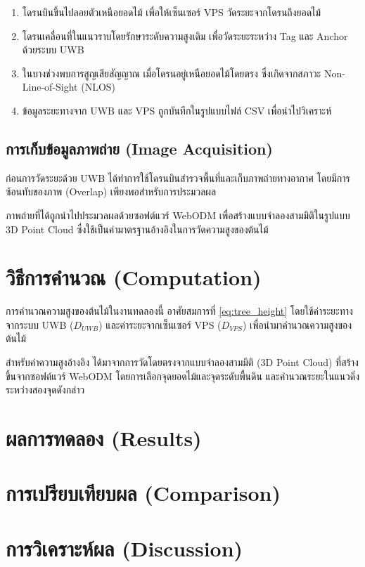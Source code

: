 \begin{enumerate}
    \item โดรนบินขึ้นไปลอยตัวเหนือยอดไม้ 
    เพื่อให้เซ็นเซอร์ VPS วัดระยะจากโดรนถึงยอดไม้

    \item โดรนเคลื่อนที่ในแนวราบโดยรักษาระดับความสูงเดิม 
    เพื่อวัดระยะระหว่าง Tag และ Anchor ด้วยระบบ UWB

    \item ในบางช่วงพบการสูญเสียสัญญาณ 
    เมื่อโดรนอยู่เหนือยอดไม้โดยตรง 
    ซึ่งเกิดจากสภาวะ Non-Line-of-Sight (NLOS)

    \item ข้อมูลระยะทางจาก UWB และ VPS 
    ถูกบันทึกในรูปแบบไฟล์ CSV เพื่อนำไปวิเคราะห์
\end{enumerate}

\subsection{การเก็บข้อมูลภาพถ่าย (Image Acquisition)}

ก่อนการวัดระยะด้วย UWB 
ได้ทำการใช้โดรนบินสำรวจพื้นที่และเก็บภาพถ่ายทางอากาศ 
โดยมีการซ้อนทับของภาพ (Overlap) เพียงพอสำหรับการประมวลผล

ภาพถ่ายที่ได้ถูกนำไปประมวลผลด้วยซอฟต์แวร์ WebODM 
เพื่อสร้างแบบจำลองสามมิติในรูปแบบ 3D Point Cloud 
ซึ่งใช้เป็นค่ามาตรฐานอ้างอิงในการวัดความสูงของต้นไม้

\section{วิธีการคำนวณ (Computation)}

การคำนวณความสูงของต้นไม้ในงานทดลองนี้ 
อาศัยสมการที่ \eqref{eq:tree_height} 
โดยใช้ค่าระยะทางจากระบบ UWB ($D_{UWB}$) 
และค่าระยะจากเซ็นเซอร์ VPS ($D_{VPS}$) 
เพื่อนำมาคำนวณความสูงของต้นไม้

สำหรับค่าความสูงอ้างอิง 
ได้มาจากการวัดโดยตรงจากแบบจำลองสามมิติ (3D Point Cloud) 
ที่สร้างขึ้นจากซอฟต์แวร์ WebODM 
โดยการเลือกจุดยอดไม้และจุดระดับพื้นดิน 
และคำนวณระยะในแนวดิ่งระหว่างสองจุดดังกล่าว

\section{ผลการทดลอง (Results)}


\section{การเปรียบเทียบผล (Comparison)}


\section{การวิเคราะห์ผล (Discussion)}

